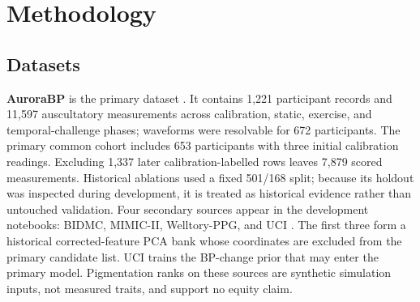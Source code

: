 \documentclass[12pt]{article}
\let\cite\citep
\begin{document}
\section{Methodology}
\label{sec:methods}
\subsection{Datasets}
\label{sec:datasets}
\textbf{AuroraBP} is the primary dataset \cite{aurorabp2022,aurorabpDataset}. It contains 1{,}221 participant records and 11{,}597 auscultatory measurements across calibration, static, exercise, and temporal-challenge phases; waveforms were resolvable for 672 participants. The primary common cohort includes 653 participants with three initial calibration readings. Excluding 1{,}337 later calibration-labelled rows leaves 7{,}879 scored measurements. Historical ablations used a fixed 501/168 split; because its holdout was inspected during development, it is treated as historical evidence rather than untouched validation.
Four secondary sources appear in the development notebooks: BIDMC, MIMIC-II, Welltory-PPG, and UCI \cite{bidmcDataset,pimentel2017,physionet2000,mimicii2011,mimiciiDataset,welltory2021,uciCufflessDataset,kachuee2015}. The first three form a historical corrected-feature PCA bank whose coordinates are excluded from the primary candidate list. UCI trains the BP-change prior that may enter the primary model. Pigmentation ranks on these sources are synthetic simulation inputs, not measured traits, and support no equity claim.
\end{document}
